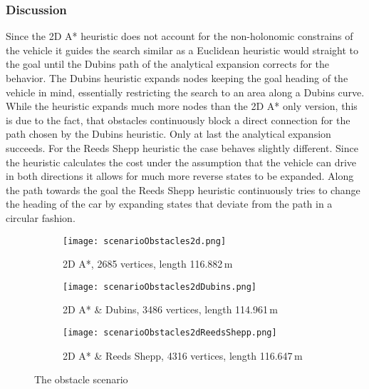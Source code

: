 \subsubsection{Discussion}
Since the 2D A* heuristic does not account for the non-holonomic constrains of the vehicle it guides the search similar as a Euclidean heuristic would straight to the goal until the Dubins path of the analytical expansion corrects for the behavior. The Dubins heuristic expands nodes keeping the goal heading of the vehicle in mind, essentially restricting the search to an area along a Dubins curve. While the heuristic expands much more nodes than the 2D A* only version, this is due to the fact, that obstacles continuously block a direct connection for the path chosen by the Dubins heuristic. Only at last the analytical expansion succeeds. For the Reeds Shepp heuristic the case behaves slightly different. Since the heuristic calculates the cost under the assumption that the vehicle can drive in both directions it allows for much more reverse states to be expanded. Along the path towards the goal the Reeds Shepp heuristic continuously tries to change the heading of the car by expanding states that deviate from the path in a circular fashion.

\begin{figure}[h]
    \centering
    \begin{subfigure}[t]{\textwidth}
        \texttt{[image: scenarioObstacles2d.png]}
        \caption{2D A*, 2685 vertices, length 116.882\,m}
        \label{fig:scenarioObstacles2d}
    \end{subfigure}
    \begin{subfigure}[t]{\textwidth}
        \texttt{[image: scenarioObstacles2dDubins.png]}
        \caption{2D A* \& Dubins, 3486 vertices, length 114.961\,m}
        \label{fig:scenarioObstacles2dDubins}
    \end{subfigure}    
    \begin{subfigure}[t]{\textwidth}
        \texttt{[image: scenarioObstacles2dReedsShepp.png]}
        \caption{2D A* \& Reeds Shepp, 4316 vertices, length 116.647\,m}
        \label{fig:scenarioObstacles2dReedsShepp}
    \end{subfigure}
    \caption{The obstacle scenario}
    \label{fig:scenarioObstacle}
\end{figure}

